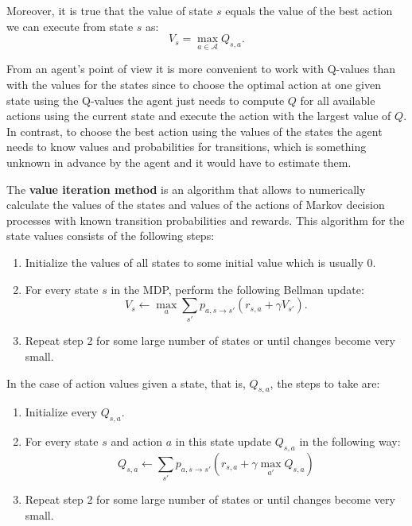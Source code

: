 \documentclass[11pt]{article}
\theoremstyle{definition}
\begin{document}
Moreover, it is true that the value of state $s$ equals the value of the best action we can execute from state $s$ as:
\begin{equation*}
    V_s = \max_{a \in \mathcal{A}} Q_{s, a}.
\end{equation*}

From an agent's point of view it is more convenient to work with Q-values than with the values for the states since to choose the optimal action at one given state using the Q-values the agent just needs to compute $Q$ for all available actions using the current state and execute the action with the largest value of $Q$. In contrast, to choose the best action using the values of the states the agent needs to know values and probabilities for transitions, which is something unknown in advance by the agent and it would have to estimate them.

The \textbf{value iteration method} is an algorithm that allows to numerically calculate the values of the states and values of the actions of Markov decision processes with known transition 
probabilities and rewards. This algorithm for the state values consists of the following steps: 

\begin{enumerate}
    \item Initialize the values of all states to some initial value which is usually 0.
    \item For every state $s$ in the MDP, perform the following Bellman update: 
        \begin{equation*}
            V_s \leftarrow \max_a \sum_{s'} p_{a, s \rightarrow s'} (r_{s, a} + \gamma V_{s'}).
        \end{equation*}
    \item Repeat step 2 for some large number of states or until changes become very small.
\end{enumerate}

In the case of action values given a state, that is, $Q_{s, a}$, the steps to take are: 
\begin{enumerate}
    \item Initialize every $Q_{s, a}$.
    \item For every state $s$ and action $a$ in this state update $Q_{s, a}$ in the following way:
        \begin{equation*}
            Q_{s, a} \leftarrow \sum_{s'} p_{a, s \rightarrow s'} (r_{s, a} + \gamma \max_{a'} Q_{s, a})
        \end{equation*}
    \item Repeat step 2 for some large number of states or until changes become very small.
\end{enumerate}
\end{document}
